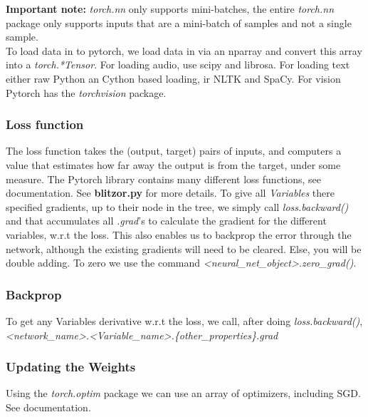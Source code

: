\documentclass[]{report}
\newcommand{\tif}{\textit}
\newcommand{\tbf}{\textbf}
\begin{document}
\tbf{Important note: } \tif{torch.nn} only supports mini-batches, the entire \tif{torch.nn} package only supports inputs that are a mini-batch of samples and not a single sample.\\

To load data in to pytorch, we load data in via an nparray and convert this array into a \textit{torch.*Tensor}.
For loading audio, use scipy and librosa. For loading text either raw Python an Cython based loading, ir NLTK and SpaCy. For vision Pytorch has the \tif{torchvision} package.  
  
 
\subsubsection{Loss function}

The loss function takes the (output, target) pairs of inputs, and computers a value that estimates how far away the output is from the target, under some measure. The Pytorch library contains many different loss functions, see documentation. See \tbf{blitzor.py} for more details.
To give all \tif{Variables} there specified gradients, up to their node in the tree, 
we simply call \tif{loss.backward()} and that accumulates all \tif{.grad}'s to calculate the gradient for the different variables, w.r.t the loss.
This also enables us to backprop the error through the network, although the existing gradients will need to be cleared. Else, you will be double adding. To zero we use the command \textit{<neural\_net\_object>.zero\_grad()}.

\subsubsection{Backprop}
To get any Variables derivative w.r.t the loss, we call, after doing \tif{loss.backward()}, \tif{<network\_name>.<Variable\_name>.\{other\_properties\}.grad}

\subsubsection{Updating the Weights}
Using the \textit{torch.optim} package we can use an array of optimizers, including SGD. See documentation. 
\end{document}
